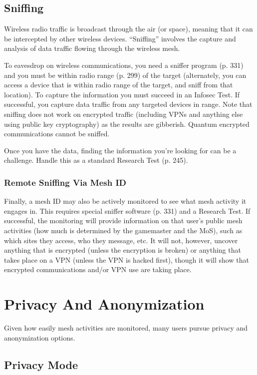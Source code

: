 \subsection{Sniffing} 

Wireless radio traffic is broadcast through the air (or space), meaning that it can be intercepted by other wireless devices. ``Sniffing'' involves the capture and analysis of data traffic flowing through the wireless mesh. 

To eavesdrop on wireless communications, you need a sniffer program (p. 331) and you must be within radio range (p. 299) of the target (alternately, you can access a device that is within radio range of the target, and sniff from that location). To capture the information you must succeed in an Infosec Test. If successful, you capture data traffic from any targeted devices in range. Note that sniffing does not work on encrypted traffic (including VPNs and anything else using public key cryptography) as the results are gibberish. Quantum encrypted communications cannot be sniffed. 

Once you have the data, finding the information you're looking for can be a challenge. Handle this as a standard Research Test (p. 245). 

\subsubsection{Remote Sniffing Via Mesh ID} 

Finally, a mesh ID may also be actively monitored to see what mesh activity it engages in. This requires special sniffer software (p. 331) and a Research Test. If successful, the monitoring will provide information on that user's public mesh activities (how much is determined by the gamemaster and the MoS), such as which sites they access, who they message, etc. It will not, however, uncover anything that is encrypted (unless the encryption is broken) or anything that takes place on a VPN (unless the VPN is hacked first), though it will show that encrypted communications and/or VPN use are taking place. 

\section{Privacy And Anonymization} 

Given how easily mesh activities are monitored, many users pursue privacy and anonymization options. 

\subsection{Privacy Mode} 

